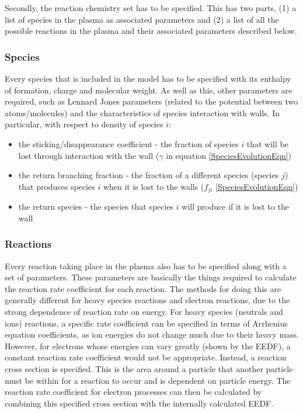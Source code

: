 \documentclass[11pt, oneside]{article}   	%
\begin{document}
Secondly, the reaction chemistry set has to be specified. 
This has two parts, (1) a list of species in the plasma as associated parameters and (2) a list of all the possible reactions in the plasma and their associated parameters described below.


\subsubsection*{Species}
Every species that is included in the model has to be specified with its enthalpy of formation, charge and molecular weight.
As well as this, other parameters are required, such as Lennard Jones parameters (related to the potential between two atoms/molecules) and the characteristics of species interaction with walls.
In particular, with respect to density of species $i$:
\begin{itemize}
\item the sticking/disappearance coefficient - the fraction of species $i$ that will be lost through interaction with the wall ($\gamma$ in equation \ref{SpeciesEvolutionEqn})
\item the return branching fraction - the fraction of a different species (species $j$) that produces species $i$ when it is lost to the walls ($f_{ji}$ \ref{SpeciesEvolutionEqn})
\item the return species - the species that species $i$ will produce if it is lost to the wall
\end{itemize}



\subsubsection*{Reactions}
\label{Reactions}
Every reaction taking place in the plasma also has to be specified along with a set of parameters.
These parameters are basically the things required to calculate the reaction rate coefficient for each reaction.
The methods for doing this are generally different for heavy species reactions and electron reactions, due to the strong dependence of reaction rate on energy.
For heavy species (neutrals and ions) reactions, a specific rate coefficient can be specified in terms of Arrhenius equation coefficients, as ion energies do not change much due to their heavy mass.
However, for electrons whose energies can vary greatly (shown by the EEDF), a constant reaction rate coefficient would not be appropriate.
Instead, a reaction cross section is specified.
This is the area around a particle that another particle must be within for a reaction to occur and is dependent on particle energy.
The reaction rate coefficient for electron processes can then be calculated by combining this specified cross section with the internally calculated EEDF.
\end{document}
